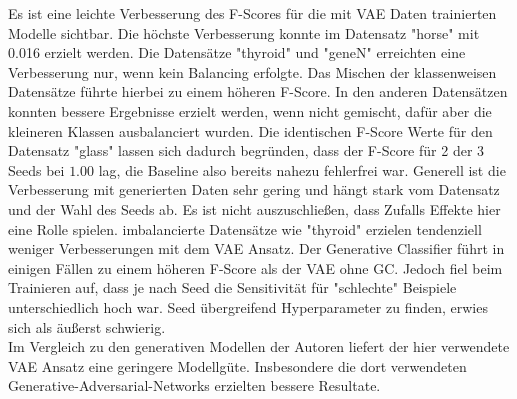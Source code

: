 Es ist eine leichte Verbesserung des F-Scores für die mit VAE Daten trainierten Modelle sichtbar. Die höchste Verbesserung konnte im Datensatz "horse" mit 0.016 erzielt werden. Die Datensätze "thyroid" und "geneN" erreichten eine Verbesserung nur, wenn kein Balancing erfolgte. Das Mischen der klassenweisen Datensätze führte hierbei zu einem höheren F-Score. In den anderen Datensätzen konnten bessere Ergebnisse erzielt werden, wenn nicht gemischt, dafür aber die kleineren Klassen ausbalanciert wurden. Die identischen F-Score Werte für den Datensatz "glass" lassen sich dadurch begründen, dass der F-Score für 2 der 3 Seeds bei $1.00$ lag, die Baseline also bereits nahezu fehlerfrei war. Generell ist die Verbesserung mit generierten Daten sehr gering und hängt stark vom Datensatz und der Wahl des Seeds ab. Es ist nicht auszuschließen, dass Zufalls Effekte hier eine Rolle spielen. imbalancierte Datensätze wie "thyroid" erzielen tendenziell weniger Verbesserungen mit dem VAE Ansatz. Der Generative Classifier führt in einigen Fällen zu einem höheren F-Score als der VAE ohne GC. Jedoch fiel beim Trainieren auf, dass je nach Seed die Sensitivität für "schlechte" Beispiele unterschiedlich hoch war. Seed übergreifend Hyperparameter zu finden, erwies sich als äußerst schwierig. \\

Im Vergleich zu den generativen Modellen der Autoren \cite{Moreno-Barea2020} liefert der hier verwendete VAE Ansatz eine geringere Modellgüte. Insbesondere die dort verwendeten Generative-Adversarial-Networks erzielten bessere Resultate.

